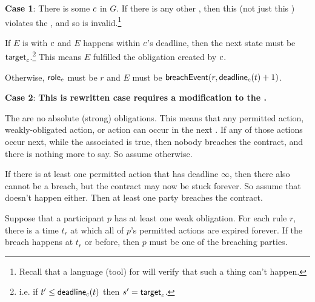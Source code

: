 \documentclass[12pt]{article}
\begin{document}
{\bf Case 1}: There is some \enabled \mustnarule $c$ in $G$. If there is any other \enabled \actionrule, then this \Contract (not just this \trace) violates the \uaoc, and so is invalid.\footnote{Recall that a language (tool) for \FSContracts will verify that such a thing can't happen.}
\begin{PPI}
    \item If $E$ is \compatible with $c$ and $E$ happens within $c$'s deadline, then the next state must be $\textsf{target}_{c}$.\footnote{i.e. if $t' \leq \textsf{deadline}_{c}(t)$ then $s' = \textsf{target}_{c}$.} This means $E$ fulfilled the obligation created by $c$.
        \item Otherwise, $\textsf{role}_{e}$ must be $r$ and $E$ must be $\textsf{breachEvent}(r,\textsf{deadline}_{c}(t) + 1)$. %
\end{PPI}

{\bf Case 2}: {\bf This is rewritten case requires a modification to the \bostgc.}

The are no \enabled absolute (strong) obligations. This means that any \enabled permitted action, \enabled weakly-obligated action, or \enabled \Env action can occur in the next \Event. If any of those actions occur next, while the associated \DeadlineFn is true, then nobody breaches the contract, and there is nothing more to say. So assume otherwise.

If there is at least one permitted action that has deadline $\infty$, then there also cannot be a breach, but the contract may now be stuck forever. So assume that doesn't happen either. Then at least one party breaches the contract. 

Suppose that a participant $p$ has at least one \enabled weak obligation. For each \enabled rule $r$, there is a time $t_r$ at which all of $p$'s permitted actions are expired forever. If the breach happens at $t_r$ or before, then $p$ must be one of the breaching parties. 
\end{document}
